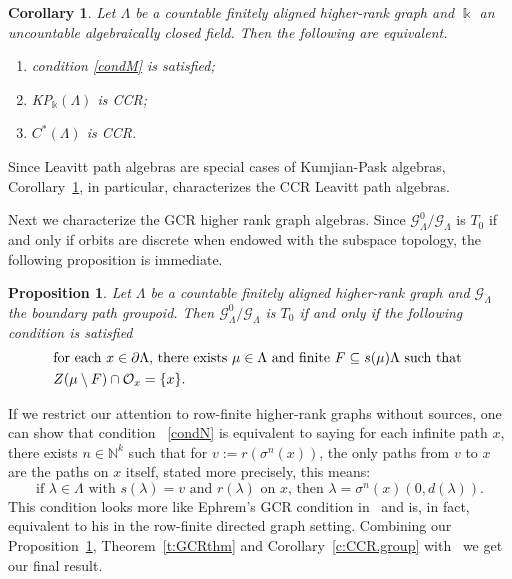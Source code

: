 \documentclass[11pt,reqno]{amsart}
\theoremstyle{plain}
\newtheorem{prop}[thm]{Proposition}
\newtheorem{cor}[thm]{Corollary}
{\theoremstyle{definition}
\newtheorem{dfn}[thm]{Definition}}
{\theoremstyle{remark}
\newtheorem{ex}[thm]{Example}}
{\theoremstyle{remark}
\newtheorem*{ex*}{Example}}
{\theoremstyle{definition}
\newtheorem{note}[thm]{Note}}
{\theoremstyle{remark}
\newtheorem{remark}[thm]{Remark}}
\numberwithin{equation}{section}
\newcommand{\G}[0]{\mathscr{G}}
\newcommand{\orb}[0]{\mathcal{O}}
\begin{document}
\begin{cor}\label{c:ccrgraph}
 Let $\Lambda$ be a countable finitely aligned higher-rank graph and $\Bbbk$ an uncountable algebraically closed field.  Then the following are equivalent.
 \begin{enumerate}
  \item condition \eqref{condM} is satisfied;
  \item KP$_{\Bbbk}(\Lambda)$ is CCR;
  \item $C^{\ast}(\Lambda)$ is CCR.
 \end{enumerate}
\end{cor}

Since Leavitt path algebras are special cases of Kumjian-Pask algebras, Corollary~\ref{c:ccrgraph}, in particular, characterizes the CCR Leavitt path algebras.

Next we characterize the GCR higher rank graph algebras.  Since $\G^{0}_{\Lambda}/\G_{\Lambda}$ is $T_0$ if and only if orbits are discrete when endowed with the subspace topology, the  following proposition is immediate.
\begin{prop}
\label{p:condN}
Let $\Lambda$ be a countable finitely aligned higher-rank graph  and $\G_{\Lambda}$ the boundary path groupoid.  Then
$\G^{0}_{\Lambda}/\G_{\Lambda}$ is $T_0$ if and only if the following condition is satisfied
\begin{align}&\label{condN}\text{for each $x \in \partial\Lambda$, there exists $\mu \in \Lambda$ and finite $F \subseteq s(\mu)\Lambda$ such that }\\
&Z(\mu \setminus F) \cap \orb_x = \{x\}.\notag
\end{align}
\end{prop}

If we restrict our attention to row-finite higher-rank graphs without sources, one can show that condition ~\eqref{condN} is equivalent to saying for each infinite path $x$, there exists $n \in \mathbb{N}^k$ such that for $v:=r(\sigma^n(x))$,  the only paths from $v$ to $x$ are the paths on $x$ itself, stated more precisely, this means:
\[\text{if $\lambda \in \Lambda$ with $s(\lambda)=v$ and $r(\lambda)$ on $x$, then
 $\lambda=\sigma^n(x)(0, d(\lambda))$.}
\]
This condition looks more like Ephrem's GCR condition in~\cite[Theorem~7.3]{Eph04} and is, in fact, equivalent to his in the row-finite directed graph setting.  Combining our Proposition~\ref{p:condN}, Theorem~\ref{t:GCRthm} and Corollary~\ref{c:CCR.group} with~\cite[Theorem~7.1]{Cl07} we get our final result.
\end{document}
